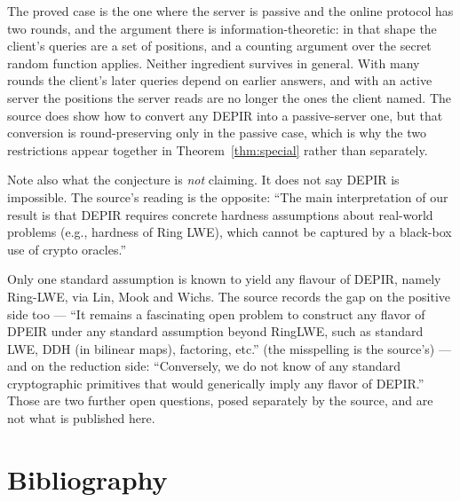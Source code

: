 \documentclass{conjura-conjecture}
\begin{document}
\begin{remark}\label{rem:obstruction}
The proved case is the one where the server is passive and the online
protocol has two rounds, and the argument there is information-theoretic:
in that shape the client's queries are a set of positions, and a
counting argument over the secret random function applies. Neither
ingredient survives in general. With many rounds the client's later
queries depend on earlier answers, and with an active server the
positions the server reads are no longer the ones the client named. The
source does show how to convert any DEPIR into a passive-server one, but
that conversion is round-preserving only in the passive case, which is
why the two restrictions appear together in Theorem~\ref{thm:special}
rather than separately.

Note also what the conjecture is \emph{not} claiming. It does not say
DEPIR is impossible. The source's reading is the opposite: ``The main
interpretation of our result is that DEPIR requires concrete hardness
assumptions about real-world problems (e.g., hardness of Ring LWE), which
cannot be captured by a black-box use of crypto oracles.''
\end{remark}

\begin{remark}\label{rem:context}
Only one standard assumption is known to yield any flavour of DEPIR,
namely Ring-LWE, via Lin, Mook and Wichs. The source records the gap on the
positive side too --- ``It remains a fascinating open problem to construct
any flavor of DPEIR under any standard assumption beyond RingLWE, such as
standard LWE, DDH (in bilinear maps), factoring, etc.'' (the misspelling
is the source's) --- and on the reduction side: ``Conversely, we do not
know of any standard cryptographic primitives that would generically
imply any flavor of DEPIR.'' Those are two further open questions, posed
separately by the source, and are not what is published here.
\end{remark}

\section{Bibliography}
\end{document}
